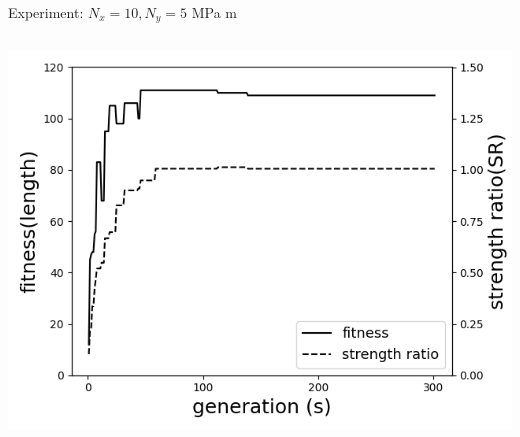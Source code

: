 \documentclass{beamer}
\begin{document}
\begin{frame}{Experiment: $N_x = 10, N_y=5 $ MPa m}
    \begin{columns}
    \begin{column}{0.5\textwidth}

        \begin{center}
			\includegraphics[width=1.0\linewidth]{./fig/two_distinct_angle_fitness_and_sr.png}
        \end{center}


\end{column}
\end{columns}
\end{frame}
\end{document}
